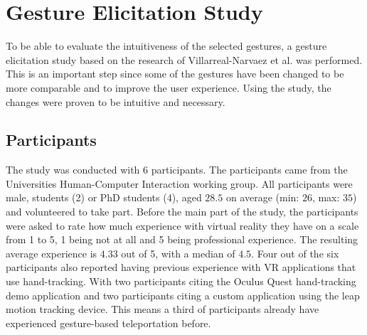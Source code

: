 
\chapter{Gesture Elicitation Study}
To be able to evaluate the intuitiveness of the selected gestures, a gesture elicitation study based on the research of Villarreal-Narvaez et al. \cite{elicitation} was performed. This is an important step since some of the gestures have been changed to be more comparable and to improve the user experience. Using the study, the changes were proven to be intuitive and necessary. 


\section{Participants}
The study was conducted with 6 participants. The participants came from the Universities Human-Computer Interaction working group. All participants were male, students (2) or PhD students (4), aged $28.5$ on average (min: $26$, max: $35$) and volunteered to take part. Before the main part of the study, the participants were asked to rate how much experience with virtual reality they have on a scale from 1 to 5, 1 being not at all and 5 being professional experience. The resulting average experience is $4.33$ out of 5, with a median of $4.5$. Four out of the six participants also reported having previous experience with VR applications that use hand-tracking. With two participants citing the Oculus Quest hand-tracking demo application and two participants citing a custom application using the leap motion tracking device.
This means a third of participants already have experienced gesture-based teleportation before. 


